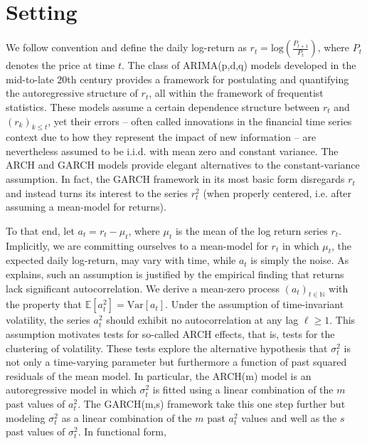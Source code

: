 \documentclass[11pt]{article}
\def\mrm#1{\mathrm{#1}} %
\def\E{\mathbb{E}} %
\theoremstyle{definition}
\begin{document}
\section{Setting}
\label{section2}

We follow convention and define the daily log-return as $r_{t} = \text{log}(\frac{P_{t+1}}{P_{t}})$, where $P_{t}$ denotes the price at time $t$.  The class of ARIMA(p,d,q) models developed in the mid-to-late 20th century \citep{box2013box} provides a framework for postulating and quantifying the autoregressive structure of $r_{t}$, all within the framework of frequentist statistics.  These models assume a certain dependence structure between $r_{t}$ and $(r_{k})_{k\leq t}$, yet their errors -- often called innovations in the financial time series context due to how they represent the impact of new information -- are nevertheless assumed to be i.i.d. with mean zero and constant variance.  The ARCH \citep{engle1982autoregressive} and GARCH \citep{bollerslev1986generalized} models provide elegant alternatives to the constant-variance assumption.  In fact, the GARCH framework in its most basic form disregards $r_{t}$ and instead turns its interest to the series $r_{t}^{2}$ (when properly centered, i.e. after assuming a mean-model for returns).  

To that end, let $a_{t} = r_{t} - \mu_{t}$, where $\mu_{t}$ is the mean of the log return series $r_{t}$.  Implicitly, we are committing ourselves to a mean-model for $r_{t}$ in which $\mu_{t}$, the expected daily log-return, may vary with time, while $a_{t}$ is simply the noise.  As \citet{cont2001empirical} explains, such an assumption is justified by the empirical finding that returns lack significant autocorrelation.  We derive a mean-zero process $(a_{t})_{t\in\mathbb{N}}$ with the property that $\E[a^{2}_{t}] = \mrm{Var}[a_{t}]$.  Under the assumption of time-invariant volatility, the series $a_{t}^{2}$ should exhibit no autocorrelation at any lag $\ell\geq1$.  This assumption motivates tests for so-called ARCH effects, that is, tests for the clustering of volatility.  These tests explore the alternative hypothesis that $\sigma_{t}^{2}$ is not only a time-varying parameter but furthermore a function of past squared residuals of the mean model.  In particular, the ARCH(m) model is an autoregressive model in which $\sigma_{t}^{2}$ is fitted using a linear combination of the $m$ past values of $a_{t}^{2}$.  The GARCH(m,s) framework take this one step further but modeling $\sigma_{t}^{2}$ as a linear combination of the $m$ past $a_{t}^{2}$ values and well as the $s$ past values of $\sigma_{t}^{2}$.  In functional form,
\end{document}

